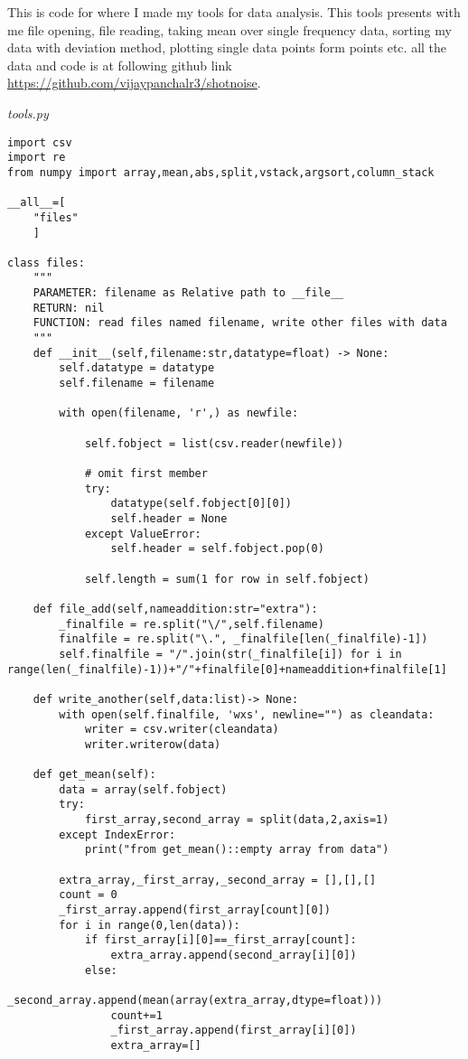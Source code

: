 
This is code for where I made my tools for data analysis. This tools presents with me file opening, file reading, taking mean over single frequency data, sorting my data with deviation method, plotting single data points form points etc. all the data and code is at following github link \href{https://github.com/vijaypanchalr3/shotnoise}{https://github.com/vijaypanchalr3/shotnoise}. 

\emph{tools.py}

\begin{verbatim}
import csv
import re
from numpy import array,mean,abs,split,vstack,argsort,column_stack

__all__=[
    "files"
    ]

class files:
    """
    PARAMETER: filename as Relative path to __file__
    RETURN: nil
    FUNCTION: read files named filename, write other files with data
    """
    def __init__(self,filename:str,datatype=float) -> None:
        self.datatype = datatype
        self.filename = filename

        with open(filename, 'r',) as newfile:
            
            self.fobject = list(csv.reader(newfile))
            
            # omit first member
            try:
                datatype(self.fobject[0][0])
                self.header = None
            except ValueError:
                self.header = self.fobject.pop(0)
                
            self.length = sum(1 for row in self.fobject)
            
    def file_add(self,nameaddition:str="extra"):
        _finalfile = re.split("\/",self.filename)
        finalfile = re.split("\.", _finalfile[len(_finalfile)-1])
        self.finalfile = "/".join(str(_finalfile[i]) for i in range(len(_finalfile)-1))+"/"+finalfile[0]+nameaddition+finalfile[1]
    
    def write_another(self,data:list)-> None:
        with open(self.finalfile, 'wxs', newline="") as cleandata:
            writer = csv.writer(cleandata)
            writer.writerow(data)
    
    def get_mean(self):
        data = array(self.fobject)
        try:
            first_array,second_array = split(data,2,axis=1)
        except IndexError:
            print("from get_mean()::empty array from data")
            
        extra_array,_first_array,_second_array = [],[],[]
        count = 0
        _first_array.append(first_array[count][0])
        for i in range(0,len(data)):
            if first_array[i][0]==_first_array[count]:
                extra_array.append(second_array[i][0])
            else:
                _second_array.append(mean(array(extra_array,dtype=float)))
                count+=1
                _first_array.append(first_array[i][0])
                extra_array=[]


\end{verbatim}
